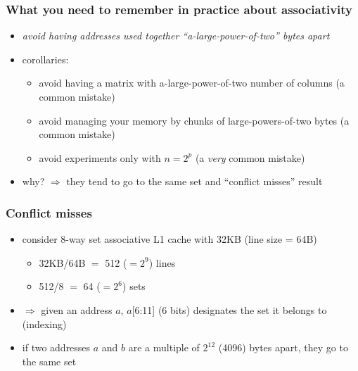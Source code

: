 \documentclass[12pt,dvipdfmx]{beamer}
\newcommand{\aka}[1]{{\color{red}#1}}
\begin{document}
\begin{frame}
\frametitle{What you need to remember in practice about associativity}
\begin{itemize}
\item \aka{\emph{avoid having addresses used together 
      ``a-large-power-of-two'' bytes apart}}
\item corollaries:
  \begin{itemize}
  \item avoid having a matrix with a-large-power-of-two number of columns 
    \aka{(a common mistake)}
  \item avoid managing your memory by chunks of large-powers-of-two bytes
    \aka{(a common mistake)}
  \item avoid experiments only with $n = 2^p$
    \aka{(a {\it very} common mistake)}
  \end{itemize}
\item why? $\Rightarrow$ they tend to go to the same set 
  and ``conflict misses'' result
\end{itemize}
\end{frame}

\begin{frame}
\frametitle{Conflict misses}
\begin{itemize}
\item consider 8-way set associative L1 cache with 32KB (line size = 64B)
  \begin{itemize}
  \item 32KB/64B $=$ 512 ($= 2^{9}$) lines
  \item 512/8 $=$ 64 ($= 2^6$) sets
  \end{itemize}
\item $\Rightarrow$ given an address $a$, $a$[6:11] (6 bits) 
  designates the set it belongs to (indexing)
  \begin{center}
\def\svgwidth{0.8\textwidth}
{\tiny}
  \end{center}

\item if two addresses $a$ and $b$ are a multiple of $2^{12}$ (4096) 
  bytes apart, they go to the same set
\end{itemize}
\end{frame}
\end{document}
